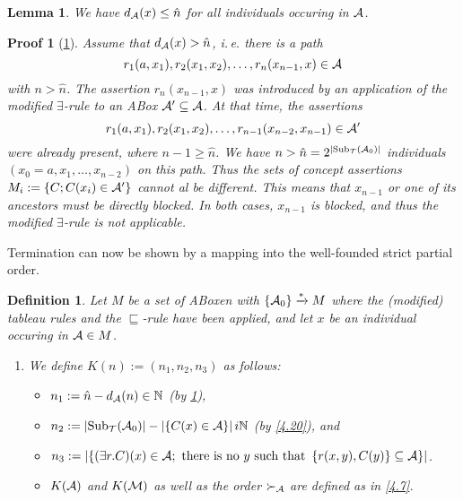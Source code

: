 \documentclass[openany]{scrbook}
\theoremstyle{break}
\newtheorem{Lemma}[Theorem]{Lemma}
\newtheorem{Definition}[Theorem]{Definition}
\theoremstyle{nonumberbreak}
\theoremstyle{nonumberplain}
\theoremstyle{nonumberbreak}
\newtheorem{Proof}{Proof}
\newcommand{\then}{\Longrightarrow}
\newcommand{\N}{\mathbb{N}}
\newcommand{\abs}[2][]{\left|{#2}\right|\ifx#1\then\else_{#1}\fi}
\newcommand{\set}[1]{\left\{#1\right\}}
\newcommand{\ie}{i{.}\,e{.}\xspace}
\newcommand{\Sub}{\operatorname{Sub}}
\begin{document}
\begin{Lemma}
  \label{4.21}
  We have $d_{\cal A}(x) \leq \hat{n}$ for all individuals occuring in
  ${\cal A}$.
\end{Lemma}

\begin{Proof}[\cref{4.21}]
  Assume that $d_{\cal A}(x) > \hat{n}$, \ie there is a path
  \begin{equation*}
    r_1(a, x_1), r_2(x_1, x_2), \dotsc, r_n(x_{n - 1}, x) \in {\cal A}
  \end{equation*}
  with $n > \hat{n}$. The assertion $r_n(x_{n - 1}, x)$ was introduced
  by an application of the modified $\exists$-rule to an ABox ${\cal
    A}' \subseteq {\cal A}$. At that time, the assertions
  \begin{equation*}
    r_1(a, x_1), r_2(x_1, x_2), \dotsc, r_{n - 1}(x_{n - 2}, x_{n - 1}) \in {\cal A}'
  \end{equation*}
  were already present, where $n - 1 \geq \hat{n}$. We have $n >
  \hat{n} = 2^{\abs{\Sub_{\cal T}({\cal A}_0)}}$ individuals $(x_0 =
  a, x_1, \dotsc, x_{n - 2})$ on this path. Thus the sets of concept
  assertions $M_i:= \set{C; C(x_i) \in {\cal A}'}$ cannot al be
  different. This means that $x_{n - 1}$ or one of its ancestors must
  be directly blocked. In both cases, $x_{n - 1}$ is blocked, and thus
  the modified $\exists$-rule is not applicable.
\end{Proof}

Termination can now be shown by a mapping into the well-founded strict
partial order.
\begin{Definition}
  \label{4.22}
  Let $M$ be a set of ABoxen with $\set{{\cal A}_0}
  \xrightarrow{*} M$ where the (modified) tableau rules and the
  $\sqsubseteq$-rule have been applied, and let $x$ be an individual
  occuring in ${\cal A} \in M$.
  \begin{enumerate}
  \item We define $K(n) := (n_1, n_2, n_3)$ as follows:
    \begin{itemize}
    \item $n_1 := \hat{n} - d_{\cal A}(n) \in \N$ (by \cref{4.21}),
    \item $n_2 := \abs{\Sub_{\cal T}({\cal A}_0)} - \abs{\set{C(x) \in
          {\cal A}}} i \N$ (by \cref{4.20}), and
    \item $n_3 := \abs{\set{(\exists r.C)(x) \in {\cal A};\
          \text{there is no}\ y\ \text{such that}\ \set{r(x, y), C(y)}
        \subseteq {\cal A}}}$.
  \item $K({\cal A})$ and $K({\cal M})$ as well as the order
    $\succ_{\cal A}$ are defined as in \cref{4.7}.
    \end{itemize}
  \end{enumerate}
\end{Definition}
\end{document}
